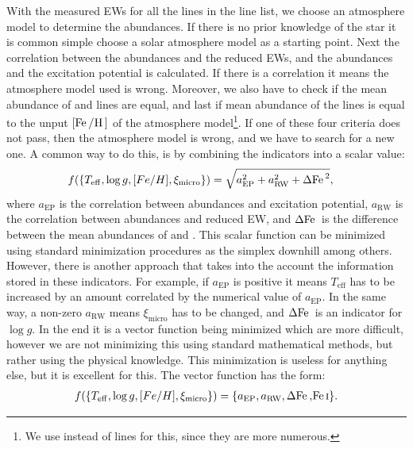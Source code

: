 With the measured EWs for all the lines in the line list, we choose an
atmosphere model to determine the abundances. If there is no prior knowledge of
the star it is common simple choose a solar atmosphere model as a starting
point. Next the correlation between the abundances and the reduced EWs, and the
abundances and the excitation potential is calculated. If there is a correlation
it means the atmosphere model used is wrong. Moreover, we also have to check if
the mean abundance of  and  lines are equal, and last if
mean abundance of the  lines is equal to the unput
$[\ion{Fe}/\ion{H}]$ of the atmosphere model\footnote{We use  instead
of  lines for this, since they are more numerous.}. If one of these
four criteria does not pass, then the atmosphere model is wrong, and we have to
search for a new one. A common way to do this, is by combining the indicators
into a scalar value:
\begin{align}
  f(\{T_\mathrm{eff}, \log g, [Fe/H], \xi_\mathrm{micro}\}) &= \sqrt{a_\mathrm{EP}^2 + a_\mathrm{RW}^2 + \Delta\ion{Fe}{}^2},
\end{align}
where $a_\mathrm{EP}$ is the correlation between abundances and excitation
potential, $a_\mathrm{RW}$ is the correlation between abundances and reduced EW,
and $\Delta\ion{Fe}{}$ is the difference between the mean abundances of
 and . This scalar function can be minimized using
standard minimization procedures as the simplex downhill among others. However,
there is another approach that takes into the account the information stored in
these indicators. For example, if $a_\mathrm{EP}$ is positive it means
$T_\mathrm{eff}$ has to be increased by an amount correlated by the numerical
value of $a_\mathrm{EP}$. In the same way, a non-zero $a_\mathrm{RW}$ means
$\xi_\mathrm{micro}$ has to be changed, and $\Delta\ion{Fe}{}$ is an indicator
for $\log g$. In the end it is a vector function being minimized which are more
difficult, however we are not minimizing this using standard mathematical
methods, but rather using the physical knowledge. This minimization is useless
for anything else, but it is excellent for this.
The vector function has the form:
\begin{align}
    f(\{T_\mathrm{eff}, \log g, [Fe/H], \xi_\mathrm{micro}\}) = \{a_\mathrm{EP}, a_\mathrm{RW}, \Delta\ion{Fe}, \ion{Fe}{I}\}.
\end{align}

